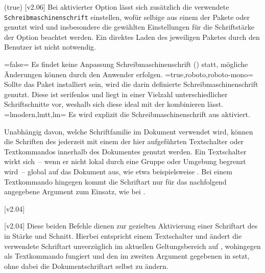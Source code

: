 \begin{DeclareEntity*}{}
\begin{DeclareEntity*}{}
\begin{DeclareEntity*}{}
\begin{Declaration}
  {}
  (true)
  [v2.06]
Bei aktivierter Option  lässt sich zusätzlich die verwendete
\texttt{Schreibmaschinenschrift} einstellen, wofür selbige aus einem der Pakete 
 oder  genutzt wird und insbesondere die 
gewählten Einstellungen für die Schriftstärke der Option  
beachtet werden. Ein direktes Laden des jeweiligen Paketes durch den Benutzer 
ist nicht notwendig.
\begin{DeclareValues}
\itemval=false=
  Es findet keine Anpassung Schreibmaschinenschrift () statt, 
  mögliche Änderungen können durch den Anwender erfolgen.
\itemval*=true,roboto,roboto-mono=
  Sollte das Paket  installiert sein, wird die darin 
  definierte Schreibmaschinenschrift genutzt. Diese ist serifenlos und liegt in 
  einer Vielzahl unterschiedlicher Schriftschnitte vor, weshalb sich diese 
  ideal mit der \OpenSans kombinieren lässt.
\itemval=lmodern,lmtt,lm=
  Es wird explizit die Schreibmaschinenschrift aus  aktiviert. 
\end{DeclareValues}
\end{Declaration}



Unabhängig davon, welche Schriftfamilie im Dokument verwendet wird, können die 
Schriften des \CDs jederzeit mit einem der hier aufgeführten Textschalter oder 
Textkommandos innerhalb des Dokumentes genutzt werden. Ein Textschalter wirkt 
sich~-- wenn er nicht lokal durch eine Gruppe oder Umgebung begrenzt wird~-- 
global auf das Dokument aus, wie etwa beispielsweise . Bei 
einem Textkommando hingegen kommt die Schriftart nur für das nachfolgend 
angegebene Argument zum Einsatz, wie bei . 
%
\begin{Declaration}
  {}
  [v2.04]
\begin{Declaration}
  {}
  [v2.04]
\printdeclarationlist
%
Diese beiden Befehle dienen zur gezielten Aktivierung einer Schriftart des \CDs 
in Stärke und Schnitt. Hierbei entspricht  einem Textschalter und 
ändert die verwendete Schriftart unverzüglich im aktuellen Geltungsbereich auf 
, wohingegen  als Textkommando fungiert und den 
im zweiten Argument gegebenen  in  setzt, ohne 
dabei die Dokumentschriftart selbst zu ändern.


\end{Declaration}
\end{Declaration}
\end{DeclareEntity*}
\end{DeclareEntity*}
\end{DeclareEntity*}
